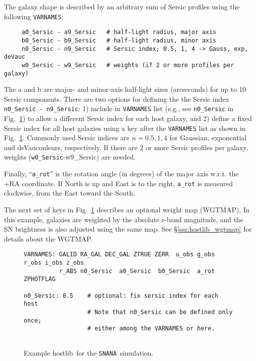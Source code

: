 \documentclass[12pt]{article}
\newcommand{\snana}{{\tt SNANA}}
\newcommand{\hostlib}{{\sc hostlib}}
\begin{document}
{The galaxy shape is described by an arbitrary sum of Sersic profiles
using the following {\tt VARNAMES}:
\begin{verbatim}
     a0_Sersic - a9_Sersic   # half-light radius, major axis
     b0_Sersic - b9_Sersic   # half-light radius, minor axis
     n0_Sersic - n9_Sersic   # Sersic index; 0.5, 1, 4 -> Gauss, exp, deVauc
     w0_Sersic - w9_Sersic   # weights (if 2 or more profiles per galaxy)
\end{verbatim}
%
The a and b are major- and minor-axis half-light sizes (arcseconds) 
for up to 10 Sersic components.
There are two options for defining the the Sersic index 
{\tt n0\_Sersic - n9\_Sersic}: 
1) include in {\tt VARNAMES} list 
(e.g., see {\tt n0\_Sersic} in Fig.~\ref{fig:hostlib})
to allow a different Sersic index for each host galaxy, and 
2) define a fixed Sersic index for all host galaxies using 
a key after the {\tt VARNAMES} list as shown in Fig.~\ref{fig:hostlib}.
Commonly used Sersic indices are $n=0.5, 1, 4$ 
for Gaussian, exponential and  deVaucouleurs,
respectively. 
If there are 2 or more Sersic profiles per galaxy, 
weights ({\tt w0\_Sersic}-{w9\_Sersic}) are needed.


Finally, ``{\tt a\_rot}'' 
is the rotation angle (in degrees) of the major axis  w.r.t. 
the +RA coordinate.  If North is up and East is to the right, 
{\tt a\_rot} is measured clockwise, from the East toward the South.

\clearpage
The next set of keys in Fig.~\ref{fig:hostlib} describes
an optional weight map (WGTMAP). In this example, galaxies are
weighted by the absolute r-band magnitude, and the
SN brightness is also adjusted using the same map.
See \S\ref{sss:hostlib_wgtmap} for details about the WGTMAP.


\begin{figure}[!] 
\begin{center}
\caption{  Example \hostlib\ for the \snana\ simulation. }
\label{fig:hostlib}
\begin{Verbatim}[frame=single]
VARNAMES: GALID RA_GAL DEC_GAL ZTRUE ZERR  u_obs g_obs r_obs i_obs z_obs
          r_ABS n0_Sersic  a0_Sersic  b0_Sersic  a_rot  ZPHOTFLAG

n0_Sersic: 0.5    # optional: fix sersic index for each host
                  # Note that n0_Sersic can be defined only once;
                  # either among the VARNAMES or here.


\end{Verbatim}
\end{center}
\end{figure}}
\end{document}

